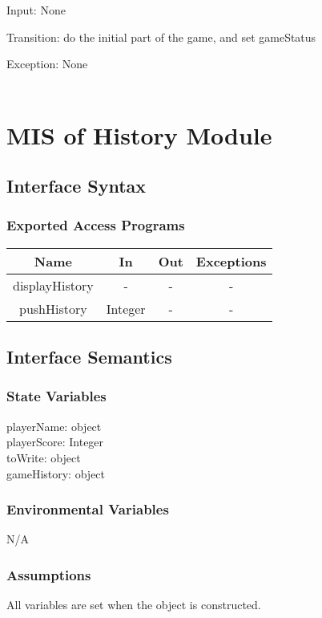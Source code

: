 \documentclass[12pt, titlepage]{article}
\begin{document}
		Input: None
		
		Transition: do the initial part of the game, and set gameStatus
				
		Exception: None\\
		\\

\section{MIS of History Module}
	\subsection{Interface Syntax}
		\subsubsection{Exported Access Programs}
		\begin{table}[!htbp]
		\begin{tabular}{|c|c|c|c|}
		\hline
	\textbf{Name}& \textbf{In} & \textbf{Out} & \textbf{Exceptions} \\ 
	\hline
			displayHistory & - & - & - \\ \hline
			pushHistory & Integer & - & - \\ \hline
		\end{tabular}
	\end{table}
		
	\subsection{Interface Semantics}
		\subsubsection{State Variables}
		playerName: object\\
		playerScore: Integer \\
		toWrite: object \\
		gameHistory: object
		
		\subsubsection{Environmental Variables}
		N/A
		\subsubsection{Assumptions}
		All variables are set when the object is constructed. 
\end{document}
